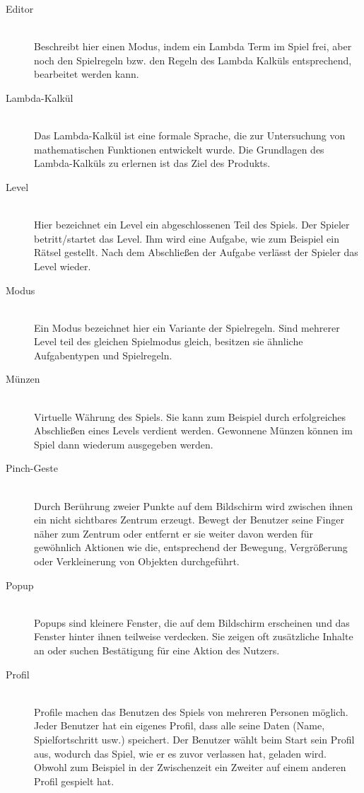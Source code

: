 \begin{description}
	\item[Editor] \hfill \\
	Beschreibt hier einen Modus, indem ein Lambda Term im Spiel frei, aber noch den Spielregeln bzw. den Regeln des Lambda Kalküls
	entsprechend, bearbeitet werden kann.
	
	\item[Lambda-Kalkül] \hfill \\
	Das Lambda-Kalkül ist eine formale Sprache, die zur Untersuchung von mathematischen Funktionen entwickelt wurde.
	Die Grundlagen des Lambda-Kalküls zu erlernen ist das Ziel des Produkts.
	
	\item[Level] \hfill \\
	Hier bezeichnet ein Level ein abgeschlossenen Teil des Spiels. Der Spieler betritt/startet das Level. Ihm wird eine Aufgabe,
	wie zum Beispiel ein Rätsel gestellt. Nach dem Abschließen der Aufgabe verlässt der Spieler das Level wieder.
	
	\item[Modus] \hfill \\
	Ein Modus bezeichnet hier ein Variante der Spielregeln. Sind mehrerer Level teil des gleichen Spielmodus gleich, 
	besitzen sie ähnliche Aufgabentypen und Spielregeln.
	
	\item[Münzen] \hfill \\
	Virtuelle Währung des Spiels. Sie kann zum Beispiel durch erfolgreiches Abschließen eines Levels verdient werden.
	Gewonnene Münzen können im Spiel dann wiederum ausgegeben werden.
	
	\item[Pinch-Geste] \hfill \\
	Durch Berührung zweier Punkte auf dem Bildschirm wird zwischen ihnen ein nicht sichtbares Zentrum erzeugt.
	Bewegt der Benutzer seine Finger näher zum Zentrum oder entfernt er sie weiter davon werden für gewöhnlich
	Aktionen wie die, entsprechend der Bewegung, Vergrößerung oder Verkleinerung von Objekten durchgeführt.
	
	\item[Popup] \hfill \\
	Popups sind kleinere Fenster, die auf dem Bildschirm erscheinen und das Fenster hinter ihnen teilweise verdecken.
	Sie zeigen oft zusätzliche Inhalte an oder suchen Bestätigung für eine Aktion des Nutzers.
	
	\item[Profil] \hfill \\
	Profile machen das Benutzen des Spiels von mehreren Personen möglich. Jeder Benutzer hat ein eigenes Profil,
	dass alle seine Daten (Name, Spielfortschritt usw.) speichert. Der Benutzer wählt beim Start sein Profil aus, wodurch das Spiel,
	wie er es zuvor verlassen hat, geladen wird. Obwohl zum Beispiel in der Zwischenzeit ein Zweiter auf einem anderen Profil gespielt hat.
	

\end{description}

